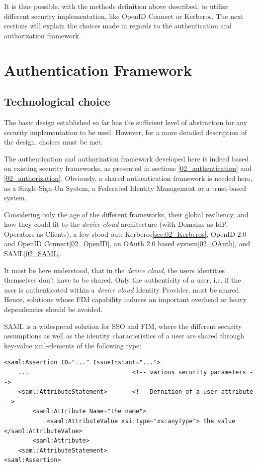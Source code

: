 It is thus possible, with the methods definition above described, to utilize different security implementation, like OpenID Connect or Kerberos. The next sections will explain the choices made in regards to the authentication and authorization framework.

\section{Authentication Framework}

\subsection{Technological choice}
The basic design established so far has the sufficient level of abstraction for any security implementation to be used. However, for a more detailed description of the design, choices must be met.

The authentication and authorization framework developed here is indeed based on existing security frameworks, as presented in sections \ref{02_authentication} and \ref{02_authorization}. Obviously, a shared authentication framework is needed here, as a Single-Sign-On System, a Federated Identity Management or a trust-based system.

Considering only the age of the different frameworks, their global resiliency, and how they could fit to the \emph{device cloud} architecture (with Domains as IdP, Operators as Clients), a few stood out: Kerberos\ref{sec:02_Kerberos}, OpenID 2.0 and OpenID Connect\ref{02_OpenID}, an OAuth 2.0 based system\ref{02_OAuth}, and SAML\ref{02_SAML}.

It must be here understood, that in the \emph{device cloud}, the users identities themselves don't have to be shared. Only the authenticity of a user, i.e. if the user is authenticated within a \emph{device cloud} Identity Provider, must be shared. Hence, solutions whose FIM capability induces an important overhead or heavy dependencies should be avoided.

SAML is a widespread solution for SSO and FIM, where the different security assumptions as well as the identity characteristics of a user are shared through key-value xml-elements of the following type:

\begin{minipage}{\linewidth}

\lstset{language=XML}
\begin{lstlisting}
<saml:Assertion ID="..." IssueInstant="...">
	...								<!-- various security parameters -->
	<saml:AttributeStatement>		<!-- Defnition of a user attribute -->
		<saml:Attribute Name="the name">
			<saml:AttributeValue xsi:type="xs:anyType"> the value </saml:AttributeValue>
		<saml:Attribute>
	<saml:AttributeStatement>
<saml:Assertion>
\end{lstlisting}
\end{minipage}


